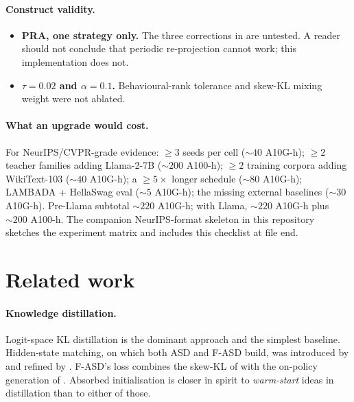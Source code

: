 \documentclass[11pt]{article}
\newcommand{\fasd}{\textsc{F-ASD}}
\newcommand{\asd}{\textsc{ASD}}
\newcommand{\pra}{\textsc{PRA}}
\begin{document}
\paragraph{Construct validity.}
\begin{itemize}[leftmargin=*,nosep]
  \item \textbf{\pra{}, one strategy only.} The three corrections in
         are untested. A reader should not conclude that
        periodic re-projection cannot work; this implementation does
        not.
  \item \textbf{$\tau\!=\!0.02$ and $\alpha\!=\!0.1$.} Behavioural-rank
        tolerance and skew-KL mixing weight were not ablated.
\end{itemize}

\paragraph{What an upgrade would cost.}
For NeurIPS/CVPR-grade evidence: $\ge\!3$ seeds per cell ($\sim\!40$
A10G-h); $\ge\!2$ teacher families adding Llama-2-7B
($\sim\!200$ A100-h); $\ge\!2$ training corpora adding WikiText-103
($\sim\!40$ A10G-h); a $\ge\!5\times$ longer schedule ($\sim\!80$
A10G-h); LAMBADA + HellaSwag eval ($\sim\!5$ A10G-h); the missing
external baselines ($\sim\!30$ A10G-h). Pre-Llama subtotal
$\sim\!220$ A10G-h; with Llama, $\sim\!220$ A10G-h plus
$\sim\!200$ A100-h. The companion NeurIPS-format skeleton in this
repository sketches the experiment matrix and includes this checklist
at file end.

\section{Related work}
\label{sec:rel}

\paragraph{Knowledge distillation.}
Logit-space KL distillation \citep{Hinton2015} is the dominant approach
and the simplest baseline. Hidden-state matching, on which both \asd{}
and \fasd{} build, was introduced by \citet{Romero2014FitNets} and
refined by \citet{Sun2019PatientKD,Jiao2020TinyBERT,Wang2020MiniLM}.
\fasd{}'s loss combines the skew-KL of \citet{Ko2024DistiLLM} with the
on-policy generation of \citet{Agarwal2024GKD}. Absorbed initialisation
is closer in spirit to \emph{warm-start} ideas in distillation than to
either of those.
\end{document}
